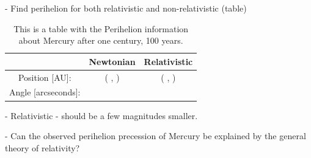 	- Find perihelion for both relativistic and non-relativistic (table)
	
\begin{table}\caption{This is a table with the Perihelion information about Mercury after one century, 100 years.}\label{tab:Perihelion}
\begin{tabular}{ccc}
 & Newtonian & Relativistic\\ \hline
Position [AU]: & ( , ) & ( , )\\
Angle [arcseconds]: & & \\
\end{tabular}
\end{table}

	- Relativistic - should be a few magnitudes smaller.	

	-  Can the observed perihelion
precession of Mercury be explained by the general theory of relativity?
